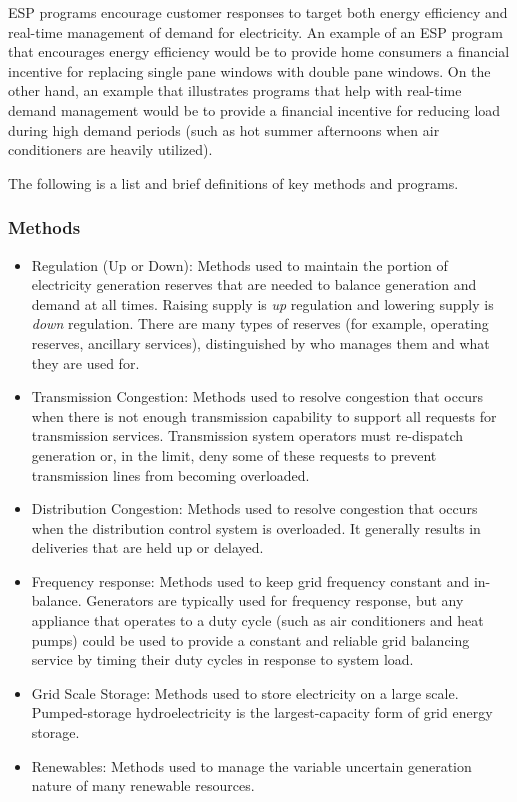 ESP programs encourage customer responses to target both energy efficiency and real-time management of demand for electricity. An example of an ESP program 
that encourages energy efficiency would be to provide home consumers a financial incentive for replacing 
single pane windows with double pane windows. On the other hand, an example that illustrates programs that help 
with real-time demand management would be to provide a financial incentive for reducing load 
during high demand periods (such as hot summer afternoons when air conditioners are heavily utilized). 

The following is a list and brief definitions of key methods and programs.  

\subsubsection{Methods}
\begin{itemize}
\item Regulation (Up or Down): Methods used to maintain the portion of electricity generation reserves 
that are needed to balance generation and demand at all times. Raising supply is \emph{up} regulation and lowering 
supply is \emph{down} regulation. There are many types of reserves (for example, operating reserves, ancillary services), distinguished by who manages them and what they are used for.

\item Transmission Congestion: Methods used to resolve congestion that occurs when there is not enough 
transmission capability to support all requests for transmission services. Transmission system operators 
must re-dispatch generation or, 
in the limit, deny some of these requests to prevent transmission lines from becoming overloaded.

\item Distribution Congestion:  Methods used to resolve congestion that occurs when the 
distribution control system 
is overloaded.  It generally results in deliveries that are held up or delayed.  

\item Frequency response:  Methods used to keep grid frequency constant and in-balance. 
Generators are typically used for frequency response, but any appliance that operates to a duty cycle 
(such as air conditioners and heat pumps) could be used to provide a 
constant and reliable grid balancing service by timing their duty cycles in response to system load.   

\item Grid Scale Storage:  Methods used to store electricity on a large scale. 
Pumped-storage hydroelectricity is the largest-capacity form of grid energy storage. 

\item Renewables:  Methods used to manage the variable uncertain generation nature of 
many renewable resources. 
\end{itemize}

